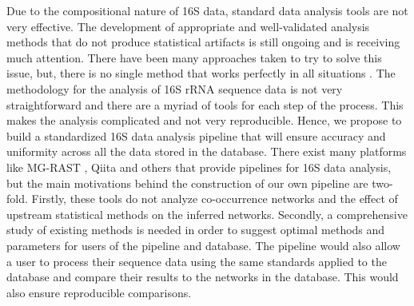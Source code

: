   Due to the compositional nature of 16S data, standard data analysis tools are not very effective.
  The development of appropriate and well-validated analysis methods that do not produce statistical artifacts is still ongoing and is receiving much attention.
  There have been many approaches taken to try to solve this issue, but, there is no single method that works perfectly in all situations \cite{Golob2017,Weiss2016}.
  The methodology for the analysis of 16S rRNA sequence data is not very straightforward and there are a myriad of tools for each step of the process.
  This makes the analysis complicated and not very reproducible.
  Hence, we propose to build a standardized 16S data analysis pipeline that will ensure accuracy and uniformity across all the data stored in the database.
  There exist many platforms like MG-RAST \cite{Keegan2016}, Qiita \cite{qiita} and others that provide pipelines for 16S data analysis, but the main motivations behind the construction of our own pipeline are two-fold.
  Firstly, these tools do not analyze co-occurrence networks and the effect of upstream statistical methods on the inferred networks.
  Secondly, a comprehensive study of existing methods is needed in order to suggest optimal methods and parameters for users of the pipeline and database.
  The pipeline would also allow a user to process their sequence data using the same standards applied to the database and compare their results to the networks in the database.
  This would also ensure reproducible comparisons.

